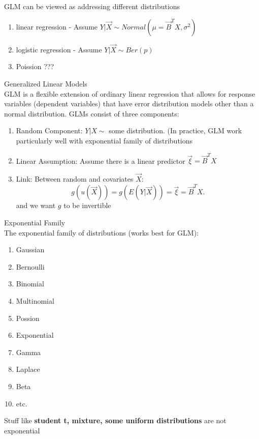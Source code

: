 \documentclass[a4paper]{article}
\begin{document}
\begin{note}
  GLM can be viewed as addressing different distributions
  \begin{enumerate}
    \item linear regression - Assume $Y | \vec{X} \sim Normal(\mu=\vec{B}^T X, \sigma^2)$ 
    \item logistic regression - Assume $Y | \vec{X} \sim Ber(p)$
    \item Poission ???
  \end{enumerate}
\end{note}

\begin{definition}{Generalized Linear Models} \\
GLM is a flexible extension of ordinary linear regression that allows for response variables (dependent variables) 
that have error distribution models other than a normal distribution. GLMs consist of three components:  
\begin{enumerate}
  \item Random Component: $Y | X \sim $ some distribution. (In practice, GLM work particularly well with exponential family of 
    distributions
  \item Linear Assumption: Assume there is a linear predictor $\vec{\xi} = \vec{B}^T X$
  \item Link: Between random and covariates  $\vec{X}$:
    \[
  g(u(\vec{X})) = g(E(Y | \vec{X})) = \vec{\xi} = \vec{B}^T X 
    .\] and we want $g$ to be invertible
\end{enumerate}
\end{definition}

\begin{note}{Exponential Family} \\
  The exponential family of distributions (works best for GLM):
  \begin{enumerate}
    \item Gaussian
    \item Bernoulli
    \item Binomial 
    \item Multinomial 
    \item Possion
    \item Exponential
    \item Gamma
    \item Laplace
    \item Beta
    \item etc.
  \end{enumerate}
  Stuff like \textbf{student t, mixture, some uniform distributions} are not exponential
\end{note}
\end{document}
